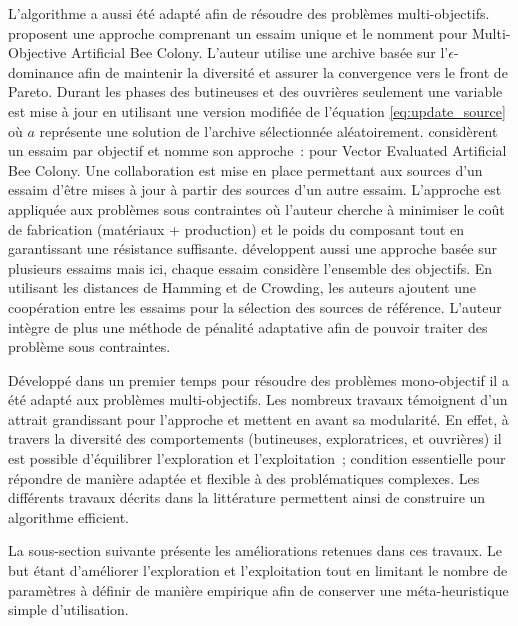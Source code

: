 L’algorithme a aussi été adapté afin de résoudre des problèmes multi-objectifs.
\textcite{Akbari201239} proposent une approche comprenant un essaim unique et le nomment
 pour Multi-Objective Artificial Bee Colony. L’auteur utilise une archive
basée sur l’$\epsilon$-dominance afin de maintenir la diversité et assurer la convergence
vers le front de Pareto. Durant les phases des butineuses et des ouvrières seulement une
variable est mise à jour en utilisant une version modifiée de l’équation
\eqref{eq:update_source} où $a$ représente une solution de l’archive sélectionnée
aléatoirement.
\textcite{Omkar2011489} considèrent un essaim par objectif et nomme son approche~: 
pour Vector Evaluated Artificial Bee Colony. Une collaboration est mise en place
permettant aux sources d’un essaim d’être mises à jour à partir des sources d’un autre
essaim. L’approche est appliquée aux problèmes sous contraintes où l’auteur cherche à
minimiser le coût de fabrication (matériaux + production) et le poids du composant tout en
garantissant une résistance suffisante.
\textcite{Zhang20121} développent aussi une approche basée sur plusieurs essaims mais ici,
chaque essaim considère l’ensemble des objectifs. En utilisant les distances de Hamming et
de Crowding, les auteurs ajoutent une coopération entre les essaims pour la sélection des
sources de référence. L’auteur intègre de plus une méthode de pénalité adaptative
\parencite{Woldesenbet20073077} afin de pouvoir traiter des problème sous contraintes.

Développé dans un premier temps pour résoudre des problèmes mono-objectif il a été adapté
aux problèmes multi-objectifs. Les nombreux travaux témoignent d’un attrait grandissant
pour l’approche et mettent en avant sa modularité. En effet, à travers la diversité des
comportements (butineuses, exploratrices, et ouvrières) il est possible d’équilibrer
l’exploration et l’exploitation~; condition essentielle pour répondre de manière adaptée
et flexible à des problématiques complexes. Les différents travaux décrits dans la
littérature permettent ainsi de construire un algorithme efficient.

La sous-section suivante présente les améliorations retenues dans ces travaux.
Le but étant d’améliorer l’exploration et l’exploitation tout en limitant le
nombre de paramètres à définir de manière empirique afin de conserver une
méta-heuristique simple d’utilisation.



